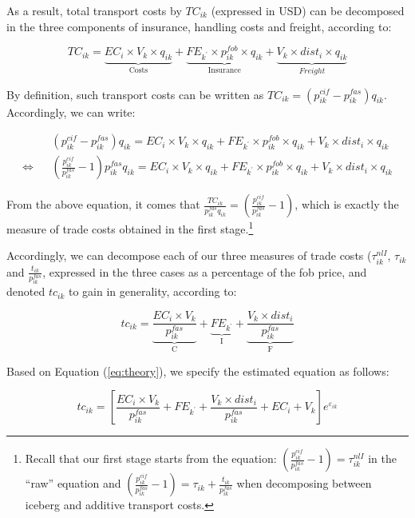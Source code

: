 \documentclass[a4paper,11pt]{article}
\begin{document}
As a result, total transport costs by $TC_{ik}$ (expressed in USD) can be decomposed in the three components of insurance, handling costs and freight, according to:

$$TC_{ik} =  \underbrace{EC_i\times V_{k}\times q_{ik}}_{\text{Costs}} +\underbrace{FE_{k^\prime}\times p_{ik}^{fob}\times q_{ik}}_{\text{Insurance}}+ \underbrace{V_k\times dist_i\times q_{ik}}_{Freight}$$

By definition, such transport costs can be written as $TC_{ik} = (p^{cif}_{ik} - p^{fas}_{ik})q_{ik}$. Accordingly, we can write:

\begin{eqnarray*}
&&(p^{cif}_{ik} - p^{fas}_{ik})q_{ik} = EC_i\times V_{k}\times q_{ik}+ FE_{k^\prime}\times p_{ik}^{fob}\times q_{ik}+ V_{k}\times dist_i\times q_{ik} \\
\Leftrightarrow && \left(\frac{p^{cif}_{ik}}{p^{fas}_{ik}} -1 \right)p^{fas}_{ik} q_{ik} = EC_i\times V_{k}\times q_{ik}+ FE_{k^\prime}\times p_{ik}^{fob}\times q_{ik}+ V_k \times dist_i\times q_{ik}
\end{eqnarray*}

From the above equation, it comes that $\frac{TC_{ik}}{p^{fas}_{ik} q_{ik}} = \left(\frac{p^{cif}_{ik}}{p^{fas}_{ik}} -1 \right)$, which is exactly the measure of trade costs obtained in the first stage.\footnote{Recall that our first stage starts from the equation: $\left(\frac{p^{cif}_{ik}}{p^{fas}_{ik}} -1 \right) = \tau^{nlI}_{ik}$ in the ``raw'' equation and $\left(\frac{p^{cif}_{ik}}{p^{fas}_{ik}} -1 \right) = \tau_{ik}+ \frac{t_{ik}}{p^{fas}_{ik}}$ when decomposing between iceberg and additive transport costs.}

Accordingly, we can decompose each of our three measures of trade costs ($\tau^{nlI}_{ik}$, $\tau_{ik}$ and $\frac{t_{ik}}{p^{fas}_{ik}}$, expressed in the three cases as a percentage of the fob price, and denoted $tc_{ik}$ to gain in generality, according to:

\begin{equation}
tc_{ik} = \underbrace{\frac{EC_i\times V_{k}}{p^{fas}_{ik}}}_{\text{C}} + \underbrace{FE_{k^\prime}}_{\text{I}}+ \underbrace{\frac{V_k\times dist_i}{p_{ik}^{fas}}}_{\text{F}} \label{eq:theory}
\end{equation}

Based on Equation (\ref{eq:theory}), we specify the estimated equation as follows:

\begin{equation}
tc_{ik} = \left[\frac{EC_i\times V_k}{p^{fas}_{ik}} + FE_{k^\prime}+ \frac{V_k\times dist_i}{p_{ik}^{fas}} + EC_i + V_k\right]e^{\varepsilon_{ik}} \label{eq:estim}
\end{equation}
\end{document}
